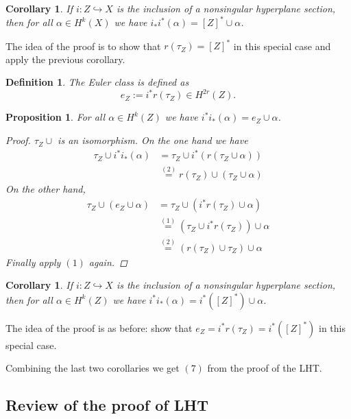 \documentclass[A4paper, british]{amsart}
\theoremstyle{darkgreentheorem}
\newtheorem{prop}[thm]{Proposition}
\newtheorem{cor}[thm]{Corollary}
\theoremstyle{darkbluedefinition}
\newtheorem{defn}[thm]{Definition}
\theoremstyle{darkredexample}
\theoremstyle{remark}
\newcommand{\1}{\mathbbm{1}}
\begin{document}
\begin{cor}
    If $i\colon Z\hookrightarrow X$ is the inclusion of a nonsingular hyperplane section, then for all $\alpha \in H^{k}(X)$ we have $i_{*}i^{*}(\alpha)=[Z]^{*}\cup \alpha$.
\end{cor}

The idea of the proof is to show that $r(\tau_{Z})=[Z]^{*}$ in this special case and apply the previous corollary.

\begin{defn}
    The \textit{Euler class} is defined as
    \[ e_{Z}:= i^{*}r(\tau_{Z})\in H^{2r}(Z). \]
\end{defn}

\begin{prop}
    For all $\alpha\in H^{k}(Z)$ we have $i^{*}i_{*}(\alpha)=e_{Z}\cup \alpha$.
    \begin{proof}
	$\tau_{Z}\cup $ is an isomorphism.
	On the one hand we have
	\begin{align*}
	    \tau_{Z}\cup i^{*}i_{*}(\alpha) & = \tau_{Z}\cup i^{*}(r(\tau_{Z}\cup \alpha)) \\
	     & \overset{(2)}{=} r(\tau_{Z})\cup (\tau_{Z}\cup \alpha)
	\end{align*}
	On the other hand,
	\begin{align*}
	    \tau_{Z}\cup (e_{Z}\cup \alpha) & = \tau_{Z}\cup (i^{*}r(\tau_{Z})\cup \alpha) \\
	    & \overset{(1)}{=} (\tau_{Z}\cup i^{*}r(\tau_{Z}))\cup \alpha \\
	    & \overset{(2)}{=} (r(\tau_{Z})\cup \tau_{Z})\cup \alpha
	\end{align*}
	Finally apply $(1)$ again.
    \end{proof}
\end{prop}

\begin{cor}
    If $i\colon Z\hookrightarrow X$ is the inclusion of a nonsingular hyperplane section, then for all $\alpha \in H^{k}(Z)$ we have $i^{*}i_{*}(\alpha)=i^{*}([Z]^{*})\cup \alpha $.
\end{cor}

The idea of the proof is as before: show that $e_{Z}=i^{*}r(\tau_{Z})=i^{*}([Z]^{*})$ in this special case.

Combining the last two corollaries we get $(7)$ from the proof of the LHT.

\subsection{Review of the proof of LHT}
\end{document}
